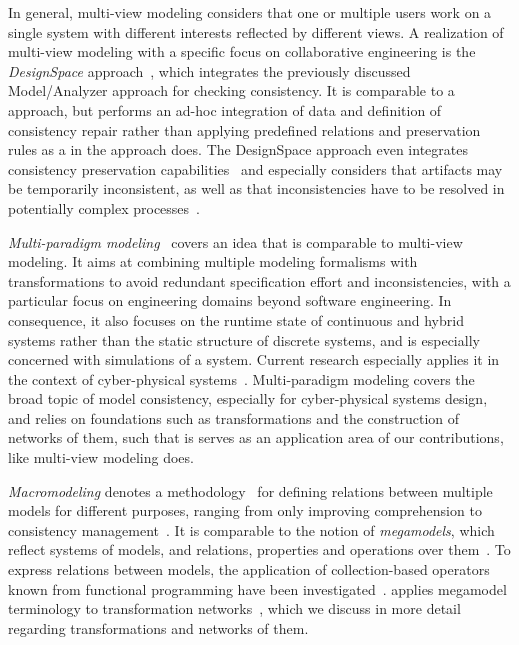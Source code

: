 In general, multi-view modeling considers that one or multiple users work on a single system with different interests reflected by different views.
A realization of multi-view modeling with a specific focus on collaborative engineering is the \emph{DesignSpace} approach~\cite{demuth2015designSpace-SAC,egyed2019consistencyArtifacts-Computer}, which integrates the previously discussed Model/Analyzer approach for checking consistency.
It is comparable to a \vsum approach, but performs an ad-hoc integration of data and definition of consistency repair rather than applying predefined relations and preservation rules as a \vsum in the \vitruv approach does.
The DesignSpace approach even integrates consistency preservation capabilities~\cite{troels2019liveconsistency-SAC, khelladi2019sideeffects-SLE} and especially considers that artifacts may be temporarily inconsistent, as well as that inconsistencies have to be resolved in potentially complex processes~\cite{kretschmer2020ConsistentChangePropagation-SoSym}.

\emph{Multi-paradigm modeling}~\cite{vangheluwe2003mpm-WSC} covers an idea that is comparable to multi-view modeling.
It aims at combining multiple modeling formalisms with transformations to avoid redundant specification effort and inconsistencies, with a particular focus on engineering domains beyond software engineering.
In consequence, it also focuses on the runtime state of continuous and hybrid systems rather than the static structure of discrete systems, and is especially concerned with simulations of a system.
Current research especially applies it in the context of cyber-physical systems~\cite{carreira2020mpm4cpsfoundations}.
Multi-paradigm modeling covers the broad topic of model consistency, especially for cyber-physical systems design, and relies on foundations such as transformations and the construction of networks of them, such that is serves as an application area of our contributions, like multi-view modeling does.

\emph{Macromodeling} denotes a methodology~\cite{salay2012macromodelingMethodoloy-MODELS} for defining relations between multiple models for different purposes, ranging from only improving comprehension to consistency management~\cite{salay2008macromodeling-ASE,salay2009macromodels-CAiSE}.
It is comparable to the notion of \emph{megamodels}, which reflect systems of models, and relations, properties and operations over them~\cite{diskin2013megamodeling-SLE}.
To express relations between models, the application of collection-based operators known from functional programming have been investigated~\cite{salay2015megamodeling-MODELS, salay2020megamodeling-SoSym}.
 applies megamodel terminology to transformation networks~\cite{stevens2020BuildingFromMegamodels-SoSym}, which we discuss in more detail regarding transformations and networks of them.

